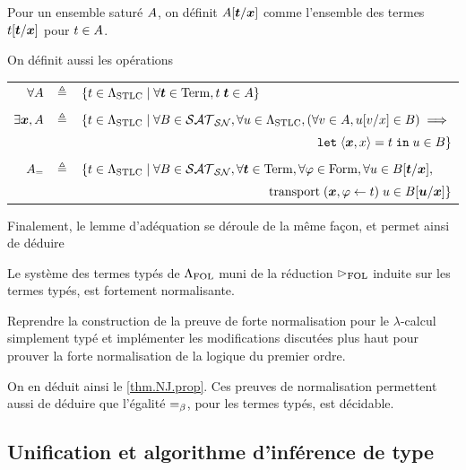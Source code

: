 Pour un ensemble saturé $A$, on définit $A[\bm{t}/\bm{x}]$ comme
l'ensemble des termes $t[\bm{t}/\bm{x}]$ pour $t \in A$.

On définit aussi les opérations
\begin{center}
  \begin{tabular}{rcl}
    $\forall A$ &$\triangleq$&
    $\left\{ t \in \Lambda_{\mathrm{STLC}} \;\middle\vert\; \forall \bm{t} \in \operatorname{Term},t\;\bm{t} \in A \right\}$
    \\
    \\
    $\exists \bm{x}, A$ &$\triangleq$&
    $\{t \in \Lambda_{\mathrm{STLC}}\mid \forall B \in \mathcal{SAT}_{\mathcal{SN}},
    \forall u \in \Lambda_{\mathrm{STLC}}, (\forall v \in A, u[v/x] \in B)
    \implies$\\
    \multicolumn{3}{r}{${\normalfont\texttt{let}}\;\langle \bm{x},x\rangle = t\;{\normalfont\texttt{in}}\;u \in B\}$}
    \\
    \\
    $A_=$ & $\triangleq$ &
    $\{ t \in \Lambda_{\mathrm{STLC}}\mid \forall B \in \mathcal{SAT}_{\mathcal{SN}},
    \forall \bm{t} \in \operatorname{Term},
    \forall \varphi \in \operatorname{Form}, \forall u \in B[\bm{t}/\bm{x}],$\\
    \multicolumn{3}{r}{
      $\operatorname{transport}\;(\bm{x},\varphi \leftarrow t)\;u \in B[\bm{u}/\bm{x}]\}$}
  \end{tabular}
\end{center}

Finalement, le lemme d'adéquation se déroule de la même façon, et permet ainsi
de déduire

\begin{theorem}
  Le système des termes typés de $\Lambda_{\mathrm{FOL}}$ muni de la réduction $\rhd_{\mathrm{FOL}}$
  induite sur les termes typés, est fortement normalisante.
\end{theorem}

\begin{exercise}
  Reprendre la construction de la preuve de forte normalisation pour le
  $\lambda$-calcul simplement typé et implémenter les modifications discutées
  plus haut pour prouver la forte normalisation de la logique du premier ordre.
\end{exercise}

On en déduit ainsi le \cref{thm.NJ.prop}.
Ces preuves de normalisation permettent aussi de déduire que l'égalité
$=_{\beta}$, pour les termes typés, est décidable.

\subsection{Unification et algorithme d'inférence de type}

